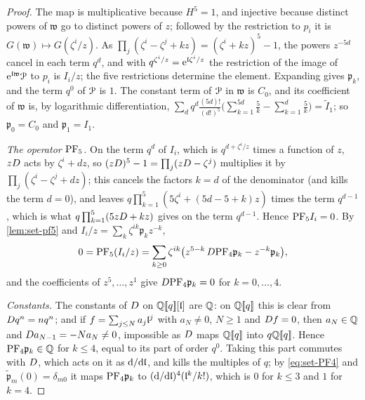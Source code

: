 \begin{proof}
The map is multiplicative because $H^5=1$, and injective because distinct powers of $\mathfrak w$ go to distinct powers of $z$; followed by the restriction to $p_i$ it is $G(\mathfrak w)\mapsto G(\zeta^i/z)$. As $\prod_j(\zeta^i-\zeta^j+kz)=(\zeta^i+kz)^5-1$, the powers $z^{-5d}$ cancel in each term $q^d$, and with $q^{\zeta^i/z}=\mathrm{e}^{\mathfrak{l}\zeta^i/z}$ the restriction of the image of $\mathrm{e}^{\mathfrak{l}\mathfrak w}\mathcal{P}$ to $p_i$ is $I_i/z$; the five restrictions determine the element. Expanding gives $\mathfrak p_k$, and the term $q^0$ of $\mathcal{P}$ is $1$. The constant term of $\mathcal{P}$ in $\mathfrak w$ is $C_0$, and its coefficient of $\mathfrak w$ is, by logarithmic differentiation, $\sum_dq^d\frac{(5d)!}{(d!)^5}\bigl(\sum_{k=1}^{5d}\frac5k-\sum_{k=1}^d\frac5k\bigr)=\tilde I_1$; so $\mathfrak p_0=C_0$ and $\mathfrak p_1=I_1$.

\emph{The operator $\mathrm{PF}_{5}$.} On the term $q^d$ of $I_i$, which is $q^{d+\zeta^i/z}$ times a function of $z$, $zD$ acts by $\zeta^i+dz$, so $(zD)^5-1=\prod_j(zD-\zeta^j)$ multiplies it by $\prod_j(\zeta^i-\zeta^j+dz)$; this cancels the factors $k=d$ of the denominator (and kills the term $d=0$), and leaves $q\prod_{k=1}^5(5\zeta^i+(5d-5+k)z)$ times the term $q^{d-1}$, which is what $q\prod_{k=1}^5(5zD+kz)$ gives on the term $q^{d-1}$. Hence $\mathrm{PF}_{5} I_i=0$. By \cref{lem:set-pf5} and $I_i/z=\sum_k\zeta^{ik}\mathfrak p_kz^{-k}$,
\[
0=\mathrm{PF}_{5}(I_i/z)=\sum_{k\geq0}\zeta^{ik}\bigl(z^{5-k}\,D\mathrm{PF}_{4}\mathfrak p_k-z^{-k}\mathfrak p_k\bigr),
\]
and the coefficients of $z^5,\dots,z^1$ give $D\mathrm{PF}_{4}\mathfrak p_k=0$ for $k=0,\dots,4$.

\emph{Constants.} The constants of $D$ on $\mathbb{Q}[\![ q ]\!][\mathfrak{l}]$ are $\mathbb{Q}$: on $\mathbb{Q}[\![ q ]\!]$ this is clear from $D q^n=nq^n$; and if $f=\sum_{j\leq N}a_j\mathfrak{l}^j$ with $a_N\neq0$, $N\geq1$ and $D f=0$, then $a_N\in\mathbb{Q}$ and $D a_{N-1}=-Na_N\neq0$, impossible as $D$ maps $\mathbb{Q}[\![ q ]\!]$ into $q\mathbb{Q}[\![ q ]\!]$. Hence $\mathrm{PF}_{4}\mathfrak p_k\in\mathbb{Q}$ for $k\leq4$, equal to its part of order $q^0$. Taking this part commutes with $D$, which acts on it as $\mathrm{d}/\mathrm{d}\mathfrak{l}$, and kills the multiples of $q$; by \eqref{eq:set-PF4} and $\tilde{\mathfrak p}_m(0)=\delta_{m0}$ it maps $\mathrm{PF}_{4}\mathfrak p_k$ to $(\mathrm{d}/\mathrm{d}\mathfrak{l})^4(\mathfrak{l}^k/k!)$, which is $0$ for $k\leq3$ and $1$ for $k=4$.
\end{proof}

